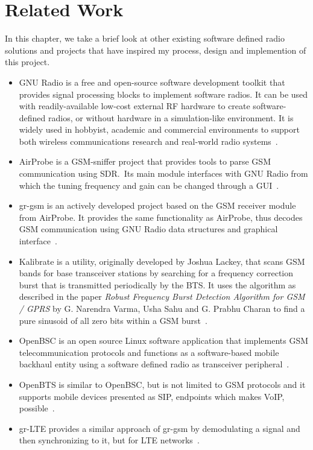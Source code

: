 \chapter{Related Work}
In this chapter, we take a brief look at other existing software
defined radio solutions and projects that have inspired my process,
design and implemention of this project.
\begin{itemize}
\item GNU Radio is a free and open-source software development toolkit
  that provides signal processing blocks to implement software
  radios. It can be used with readily-available low-cost external RF
  hardware to create software-defined radios, or without hardware in a
  simulation-like environment. It is widely used in hobbyist, academic
  and commercial environments to support both wireless communications
  research and real-world radio systems~\cite{gnuradio}.
\item AirProbe is a \gls{GSM}-sniffer project that provides tools to
  parse \gls{GSM} communication using \gls{SDR}.\ Its main module
  interfaces with GNU Radio from which the tuning frequency and gain
  can be changed through a \gls{GUI}~\cite{airprobe}.
\item gr-gsm is an actively developed project based on the \gls{GSM}
  receiver module from AirProbe. It provides the same functionality as
  AirProbe, thus decodes \gls{GSM} communication using GNU Radio data
  structures and graphical interface~\cite{grgsm}.
\item Kalibrate is a utility, originally developed by Joshua Lackey,
  that scans \gls{GSM} bands for base transceiver stations by
  searching for a frequency correction burst that is transmitted
  periodically by the BTS. It uses the algorithm as described in the
  paper \textit{Robust Frequency Burst Detection Algorithm for GSM /
    GPRS} by G. Narendra Varma, Usha Sahu and G. Prabhu Charan to find
  a pure sinusoid of all zero bits within a GSM
  burst~\cite{kalibrate}.
\item OpenBSC is an open source Linux software application that
  implements \gls{GSM} telecommunication protocols and functions as a
  software-based mobile backhaul entity using a software defined radio
  as transceiver peripheral~\cite{openbsc}.
\item OpenBTS is similar to OpenBSC, but is not limited to \gls{GSM}
  protocols and it supports mobile devices presented as \gls{SIP},
  endpoints which makes \gls{VoIP}, possible~\cite{openbts}.
\item gr-LTE provides a similar approach of gr-gsm by demodulating a
  signal and then synchronizing to it, but for \gls{LTE}
  networks~\cite{grlte}.
\end{itemize}
